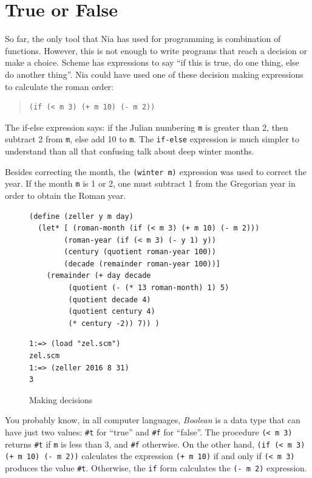 \documentclass[a4paper,12pt]{book}
\newenvironment{fmpage}[1]
           {\begin{lrbox}{\fmbox}\begin{minipage}{#1}}
           {\end{minipage}\end{lrbox}\fbox{\usebox{\fmbox}}}
\begin{document}
\section{True or False}
So far, the only tool that Nia has used
for programming is combination of functions.
However, this is not enough to write
programs that reach a decision or
make a choice. Scheme has expressions
to say ``if this is true, do one thing,
else do another thing''. Nia 
could have used one of these decision
making expressions to calculate the roman
order:
\begin{quote}
\begin{verbatim}
(if (< m 3) (+ m 10) (- m 2))
\end{verbatim}
\end{quote}
The if-else expression says: if the
Julian numbering \verb|m| is greater
than 2, then subtract 2 from \verb|m|,
else add 10 to \verb|m|. The \verb|if-else|
expression is much simpler to understand
than all that confusing talk about deep
winter months.

Besides correcting the month, the \verb|(winter m)|
expression was used to correct the year. If
the month \verb|m| is 1 or 2, one must subtract
1 from the Gregorian year in order to obtain
the Roman year.

\begin{figure}[!h]
\begin{fmpage}{0.9\linewidth}
\begin{verbatim}
(define (zeller y m day)
  (let* [ (roman-month (if (< m 3) (+ m 10) (- m 2)))
        (roman-year (if (< m 3) (- y 1) y))
        (century (quotient roman-year 100))
        (decade (remainder roman-year 100))]
    (remainder (+ day decade
         (quotient (- (* 13 roman-month) 1) 5)
         (quotient decade 4)
         (quotient century 4)
         (* century -2)) 7)) )
\end{verbatim}
\end{fmpage}

\begin{fmpage}{0.9\linewidth}
\begin{verbatim}
1:=> (load "zel.scm")
zel.scm
1:=> (zeller 2016 8 31)
3
\end{verbatim}
\end{fmpage}
\caption{Making decisions}
\label{fig:zeller}
\end{figure}

You probably know, in all computer
languages, {\em Boolean} is a data type
that can have just two values: \verb|#t|
for ``true'' and \verb|#f| for ``false''.
The procedure \verb|(< m 3)| returns
\verb|#t| if \verb|m| is less than 3,
and \verb|#f| otherwise. On the other
hand, \verb|(if (< m 3) (+ m 10) (- m 2))|
calculates the expression \verb|(+ m 10)|
if and only if \verb|(< m 3)| produces
the value \verb|#t|. Otherwise, the
\verb|if| form calculates the \verb|(- m 2)|
expression.
\end{document}
